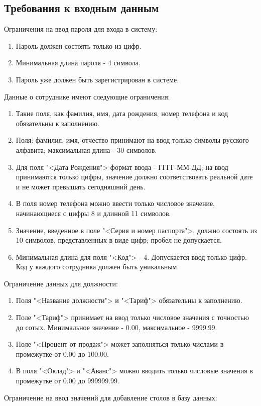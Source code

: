 \subsection{Требования к входным данным}
Ограничения на ввод пароля для входа в систему:
\begin{enumerate}
	\item Пароль должен состоять только из цифр.
	\item Минимальная длина пароля - 4 символа.
	\item Пароль уже должен быть зарегистрирован в системе.
\end{enumerate}
Данные о сотруднике имеют следующие ограничения:
\begin{enumerate}
	\item Такие поля, как фамилия, имя, дата рождения, номер телефона и код обязательны к заполнению.
	\item Поля: фамилия, имя, отчество принимают на ввод только символы русского алфавита; максимальная длина - 30 символов.
	\item Для поля "<Дата Рождения"> формат ввода - ГГГГ-ММ-ДД; на ввод принимаются только цифры, значение должно соответствовать реальной дате и не может превышать сегодняшний день.
	\item В поля номер телефона можно ввести только числовое значение, начинающиеся с цифры 8 и длинной 11 символов.
	\item Значение, введенное в поле "<Серия и номер паспорта">, должно состоять из 10 символов, представленных в виде цифр; пробел не допускается.
	\item Минимальная длина для поля "<Код"> - 4. Допускается ввод только цифр. Код у каждого сотрудника должен быть уникальным.
\end{enumerate}
Ограничение данных для должности:
\begin{enumerate}
	\item Поля "<Название должности"> и "<Тариф"> обязательны к заполнению.
	\item Поле "<Тариф"> принимает на ввод только числовое значения с точностью до сотых. Минимальное значение - 0.00, максимальное - 9999.99.
	\item Поле "<Процент от продаж"> может заполняться только числами в промежутке от 0.00 до 100.00.
	\item В поля "<Оклад"> и "<Аванс"> можно вводить только числовые значения в промежутке от 0.00 до 999999.99.
\end{enumerate}
Ограничение на ввод значений для добавление столов в базу данных:
